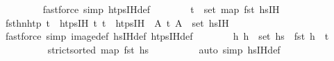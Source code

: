 \begin{isabellebody}
\ \ \ \ \ \ \ \ \isamarkupfalse%
{\isacharparenleft}{\kern0pt}fastforce\ simp{\isacharcolon}{\kern0pt}\ htps{\isacharunderscore}{\kern0pt}IH{\isacharunderscore}{\kern0pt}def{\isacharparenright}{\kern0pt}\isanewline
\ \ \ \ \ \ \isamarkupfalse%
\ {\isachardoublequoteopen}t\ {\isasymin}\ set\ {\isacharparenleft}{\kern0pt}map\ fst\ hs{\isacharprime}{\kern0pt}{\isacharunderscore}{\kern0pt}IH{\isacharparenright}{\kern0pt}{\isachardoublequoteclose}\isanewline
\ \ \ \ \ \ \ \ \isamarkupfalse%
\ fst{\isacharunderscore}{\kern0pt}h{}{\isacharprime}{\kern0pt}{\isacharunderscore}{\kern0pt}n{\isacharunderscore}{\kern0pt}htp\ {\isacartoucheopen}t\ {\isasymin}\ htps{\isacharunderscore}{\kern0pt}IH{\isacartoucheclose}\ {\isacartoucheopen}{\isasymAnd}t{\isacharprime}{\kern0pt}{\isacharprime}{\kern0pt}{\isachardot}{\kern0pt}\ t{\isacharprime}{\kern0pt}{\isacharprime}{\kern0pt}\ {\isasymin}\ htps{\isacharunderscore}{\kern0pt}IH\ {\isasymLongrightarrow}\ {\isasymexists}A{\isachardot}{\kern0pt}\ {\isacharparenleft}{\kern0pt}t{\isacharprime}{\kern0pt}{\isacharprime}{\kern0pt}{\isacharcomma}{\kern0pt}\ A{\isacharparenright}{\kern0pt}\ {\isasymin}\ set\ hs{\isacharprime}{\kern0pt}{\isacharunderscore}{\kern0pt}IH{\isacartoucheclose}\isanewline
\ \ \ \ \ \ \ \ \isamarkupfalse%
\ {\isacharparenleft}{\kern0pt}fastforce\ simp{\isacharcolon}{\kern0pt}\ image{\isacharunderscore}{\kern0pt}def\ hs{\isacharprime}{\kern0pt}{\isacharunderscore}{\kern0pt}IH{\isacharunderscore}{\kern0pt}def\ htps{\isacharunderscore}{\kern0pt}IH{\isacharunderscore}{\kern0pt}def{\isacharparenright}{\kern0pt}{\isacharplus}{\kern0pt}\isanewline
\ \ \ \ \ \ \isamarkupfalse%
\ {\isachardoublequoteopen}{\isasymAnd}h{}{\isacharprime}{\kern0pt}{\isachardot}{\kern0pt}\ h{}{\isacharprime}{\kern0pt}\ {\isasymin}\ set\ hs{}{\isacharprime}{\kern0pt}\ {\isasymLongrightarrow}\ fst\ h{}{\isacharprime}{\kern0pt}\ {\isacharless}{\kern0pt}\ t\isanewline
\ \ \ \ \ \ \ \ \isamarkupfalse%
\ {\isacartoucheopen}strict{\isacharunderscore}{\kern0pt}sorted\ {\isacharparenleft}{\kern0pt}map\ fst\ hs{\isacharprime}{\kern0pt}{\isacharparenright}{\kern0pt}{\isacartoucheclose}\isanewline
\ \ \ \ \ \ \ \ \isamarkupfalse%
\ {\isacharparenleft}{\kern0pt}auto\ simp{\isacharcolon}{\kern0pt}\ hs{\isacharprime}{\kern0pt}{\isacharunderscore}{\kern0pt}IH{\isacharunderscore}{\kern0pt}def{\isacharparenright}{\kern0pt}\isanewline

\end{isabellebody}
